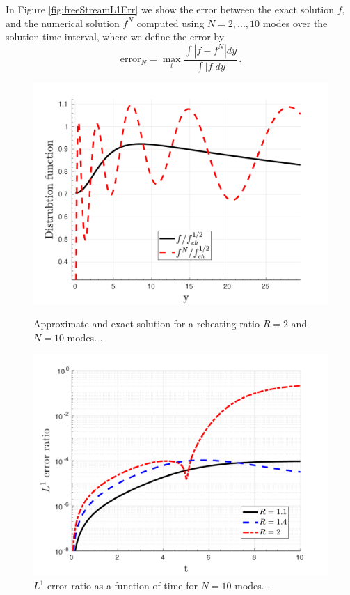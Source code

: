 In Figure  \ref{fig:freeStreamL1Err} we show the error between the exact solution $f$, and the numerical solution $f^N$ computed using $N=2,...,10$ modes over the solution time interval, where we define the error by
\begin{equation}\label{fErr}
\text{error}_N=\max_{t} \frac{\int |f-f^N|dy}{\int |f|dy}\,.
\end{equation}
\begin{figure}[ht]
\centerline{\includegraphics[width=0.8\linewidth]{06-appendix/SpectralMethodBoltzmann/Figures/free_stream_approx_T_r_2.pdf}}
\caption{Approximate and exact solution for a reheating ratio $R=2$ and $N=10$ modes. .}\label{fig:freeStreamApproxTr2}
 \centerline{\includegraphics[width=0.8\linewidth]{06-appendix/SpectralMethodBoltzmann/Figures/free_stream_L1_err_time.pdf}}
\caption{$L^1$ error ratio as a function of time for $N=10$ modes. .}\label{fig:freeStreamL1errTime}
\end{figure}

